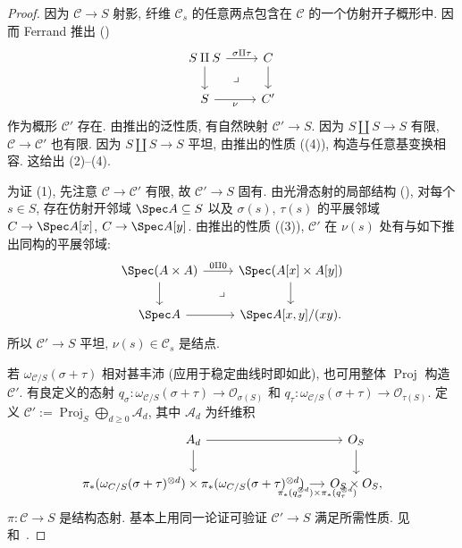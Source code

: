 \begin{proof}
因为 $\mathcal C\to\allowbreak S$ 射影, 纤维 $\mathcal C_s$ 的任意两点包含在 $\mathcal C$ 的一个仿射开子概形中. 因而 Ferrand 推出 ()
\[
\begin{tikzcd}
S\amalg S\arrow[r,"\sigma\amalg\tau"]\arrow[d]&\mathcal C\arrow[d]\\
S\arrow[r,"\nu"']\arrow[ur,phantom,"\lrcorner"]&\mathcal C'
\end{tikzcd}
\]
作为概形 $\mathcal C'$ 存在. 由推出的泛性质, 有自然映射 $\mathcal C'\to\allowbreak S$. 因为 $S\amalg S\to\allowbreak S$ 有限, $\mathcal C\to\mathcal C'$ 也有限. 因为 $S\amalg S\to\allowbreak S$ 平坦, 由推出的性质 ((4)), 构造与任意基变换相容. 这给出 (2)--(4).

为证 (1), 先注意 $\mathcal C\to\mathcal C'$ 有限, 故 $\mathcal C'\to\allowbreak S$ 固有. 由光滑态射的局部结构 (), 对每个 $s\in S$, 存在仿射开邻域 $\Spec A\subseteq S$ 以及 $\sigma(s)$, $\tau(s)$ 的平展邻域 $\mathcal C\to\Spec A[x]$, $\mathcal C\to\Spec A[y]$. 由推出的性质 ((3)), $\mathcal C'$ 在 $\nu(s)$ 处有与如下推出同构的平展邻域:
\[
\begin{tikzcd}
\Spec(A\times A)\arrow[r,"0\amalg0"]\arrow[d]&\Spec(A[x]\times A[y])\arrow[d]\\
\Spec A\arrow[r]\arrow[ur,phantom,"\lrcorner"]&\Spec A[x,y]/(xy).
\end{tikzcd}
\]
所以 $\mathcal C'\to\allowbreak S$ 平坦, $\nu(s)\in\mathcal C_s$ 是结点.

若 $\omega_{\mathcal C/S}(\sigma+\tau)$ 相对甚丰沛 (应用于稳定曲线时即如此), 也可用整体 $\operatorname{Proj}$ 构造 $\mathcal C'$. 有良定义的态射 $q_\sigma:\omega_{\mathcal C/S}(\sigma+\tau)\to\mathcal O_{\sigma(S)}$ 和 $q_\tau:\omega_{\mathcal C/S}(\sigma+\tau)\to\mathcal O_{\tau(S)}$. 定义 $\mathcal C':=\operatorname{Proj}_S\bigoplus_{d\geq0}\mathcal A_d$, 其中 $\mathcal A_d$ 为纤维积
\[
\begin{tikzcd}[column sep=small]
\mathcal A_d\arrow[r]\arrow[d]&\mathcal O_S\arrow[d]\\
\pi_*(\omega_{\mathcal C/S}(\sigma+\tau)^{\otimes d})\times\pi_*(\omega_{\mathcal C/S}(\sigma+\tau)^{\otimes d})\arrow[r,"\pi_*(q_\sigma^{\otimes d})\times\pi_*(q_\tau^{\otimes d})"']&\mathcal O_S\times\mathcal O_S,
\end{tikzcd}
\]
$\pi:\mathcal C\to\allowbreak S$ 是结构态射. 基本上用同一论证可验证 $\mathcal C'\to\allowbreak S$ 满足所需性质. 见~\cite[定理 3.4]{Knu83a} 和~\cite[\S X.7]{ACG11}.
\end{proof}
